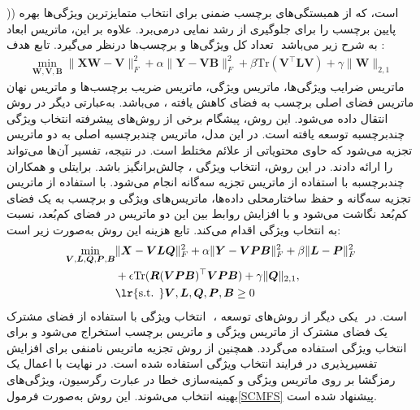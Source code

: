 	)‎) \cite{jian2016multi} 
	است، که از همبستگی‌های برچسب ضمنی برای انتخاب متمایزترین ویژگی‌ها بهره می‌برد. علاوه بر این، 
	ماتریس ابعاد‎‎پایین برچسب را برای جلوگیری از رشد نمایی در تعداد کل ویژگی‌ها و برچسب‌ها درنظر می‌گیرد. تابع هدف  ‎ ‎به شرح زیر می‌باشد :
	\begin{align}
		\min_{\bm{W} ,\bm{V}, \bm{B}}\lVert\bm{XW}-\bm{V}\rVert^2_F + \alpha\lVert\bm{Y}-\bm{V}\bm{B}\rVert^2_F + 
		\beta\mathrm{Tr}(\bm{V}^\top \bm{LV}) +\gamma\lVert\bm{W}\lVert_{2,1}
	\end{align}
	 ماتریس ضرایب ویژگی‌ها،
	 ماتریس ویژگی،
	 ماتریس ضریب برچسب‌ها و
	 ماتریس نهان می‌باشد.
	به‌عبارتی دیگر در روش ‎‎، ماتریس فضای اصلی برچسب به فضای کاهش یافته انتقال داده می‌شود. این روش، پیشگام برخی از روش‌های پیشرفته انتخاب ویژگی چندبرچسبه توسعه یافته است. در این مدل، ماتریس چند‌برچسبه اصلی به دو ماتریس‌ تجزیه می‌شود که حاوی محتویاتی از علائم مختلط است. در نتیجه، تفسیر آن‌ها می‌تواند چالش‌برانگیز باشد. برایتلی و همکاران‎ \cite{braytee2017multi}، ‎را ارائه دادند. در این روش، انتخاب ویژگی چندبرچسبه با استفاده از ماتریس تجزیه سه‌گانه انجام می‌شود. با استفاده از ماتریس تجزیه سه‌گانه و حفظ ساختارمحلی داده‌ها، ماتریس‌های ویژگی و برچسب به یک فضای کم‌بُعد نگاشت می‌شود و با افزایش روابط بین این دو ماتریس در فضای کم‌بُعد، نسبت به انتخاب ویژگی اقدام می‌کند. تابع هزینه این روش به‌صورت زیر است:
		\begin{align}
		\min_{\bm{V} ,\bm{L},\bm{Q},\bm{P},\bm{B}}&\lVert\bm{X}-\bm{VLQ}\rVert^2_F + \alpha\lVert\bm{Y}-\bm{V}\bm{P}\bm{B}\rVert^2_F + 
		\beta\lVert\bm{L}-\bm{P}\rVert^2_F \nonumber\\
		& +\epsilon\mathrm{Tr}(\bm{R}(\bm{VPB})^\top \bm{VPB})  +\gamma\lVert{\bm{Q}}\lVert_{2,1},\nonumber\\
		&{\text{\lr{s.t. }}}{\bm{V},\bm{L},\bm{Q},\bm{P},\bm{B}}\geq 0
	\end{align}
	انتخاب ویژگی با استفاده از فضای مشترک ‎ \cite{hu2020multi}، یکی دیگر از روش‌های توسعه ‎‎ است. در ‎ یک فضای مشترک از ماتریس ویژگی و ماتریس برچسب استخراج می‌شود و برای انتخاب ویژگی استفاده می‌گردد. همچنین از روش تجزیه ماتریس نامنفی برای افزایش تفسیرپذیری در فرایند انتخاب ویژگی استفاده شده است. در نهایت با اعمال یک رمزگشا بر روی ماتریس ویژگی و کمینه‌سازی خطا در عبارت رگرسیون، ویژگی‌های بهینه انتخاب می‌شوند. این روش به‌صورت فرمول\eqref{SCMFS} پیشنهاد شده است.
